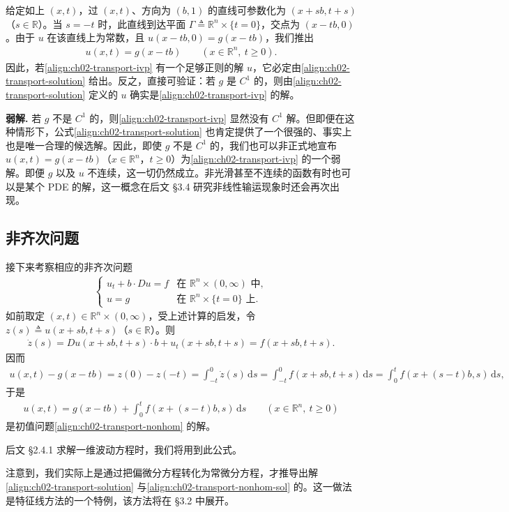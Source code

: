 \documentclass[../../main.tex]{subfiles}
\begin{document}
给定如上 $(x,t)$，过 $(x,t)$、方向为 $(b,1)$ 的直线可参数化为 $(x+sb,t+s)$（$s\in\mathbb{R}$）。当 $s=-t$ 时，此直线到达平面 $\Gamma\triangleq\mathbb{R}^n\times\{t=0\}$，交点为 $(x-tb,0)$。由于 $u$ 在该直线上为常数，且 $u(x-tb,0)=g(x-tb)$，我们推出
\begin{align}\label{align:ch02-transport-solution}
u(x,t)=g(x-tb) \qquad (x\in\mathbb{R}^n,\ t\geqslant 0).
\end{align}
因此，若\eqref{align:ch02-transport-ivp} 有一个足够正则的解 $u$，它必定由\eqref{align:ch02-transport-solution} 给出。反之，直接可验证：若 $g$ 是 $C^1$ 的，则由\eqref{align:ch02-transport-solution} 定义的 $u$ 确实是\eqref{align:ch02-transport-ivp} 的解。

\textbf{弱解.} 若 $g$ 不是 $C^1$ 的，则\eqref{align:ch02-transport-ivp} 显然没有 $C^1$ 解。但即便在这种情形下，公式\eqref{align:ch02-transport-solution} 也肯定提供了一个很强的、事实上也是唯一合理的候选解。因此，即使 $g$ 不是 $C^1$ 的，我们也可以非正式地宣布 $u(x,t)=g(x-tb)$（$x\in\mathbb{R}^n$，$t\geqslant 0$）为\eqref{align:ch02-transport-ivp} 的一个弱解。即便 $g$ 以及 $u$ 不连续，这一切仍然成立。非光滑甚至不连续的函数有时也可以是某个 PDE 的解，这一概念在后文 \S3.4 研究非线性输运现象时还会再次出现。

\subsection{非齐次问题}\label{subsection:ch02-transport-nonhom}

接下来考察相应的非齐次问题
\begin{align}\label{align:ch02-transport-nonhom}
\begin{cases}
u_t+b\cdot Du=f & \text{在 }\mathbb{R}^n\times(0,\infty)\text{ 中},\\
u=g & \text{在 }\mathbb{R}^n\times\{t=0\}\text{ 上}.
\end{cases}
\end{align}
如前取定 $(x,t)\in\mathbb{R}^n\times(0,\infty)$，受上述计算的启发，令 $z(s)\triangleq u(x+sb,t+s)$（$s\in\mathbb{R}$）。则
\begin{align*}
\dot{z}(s)=Du(x+sb,t+s)\cdot b+u_t(x+sb,t+s)=f(x+sb,t+s).
\end{align*}
因而
\begin{align*}
u(x,t)-g(x-tb)=z(0)-z(-t)=\int_{-t}^{0}\dot{z}(s)\,\mathrm{d}s
=\int_{-t}^{0}f(x+sb,t+s)\,\mathrm{d}s
=\int_0^t f(x+(s-t)b,s)\,\mathrm{d}s,
\end{align*}
于是
\begin{align}\label{align:ch02-transport-nonhom-sol}
u(x,t)=g(x-tb)+\int_0^t f(x+(s-t)b,s)\,\mathrm{d}s \qquad (x\in\mathbb{R}^n,\ t\geqslant 0)
\end{align}
是初值问题\eqref{align:ch02-transport-nonhom} 的解。

后文 \S2.4.1 求解一维波动方程时，我们将用到此公式。

\begin{remark}\label{remark:ch02-特征法注记}
注意到，我们实际上是通过把偏微分方程转化为常微分方程，才推导出解\eqref{align:ch02-transport-solution} 与\eqref{align:ch02-transport-nonhom-sol} 的。这一做法是特征线方法的一个特例，该方法将在 \S3.2 中展开。
\end{remark}
\end{document}

